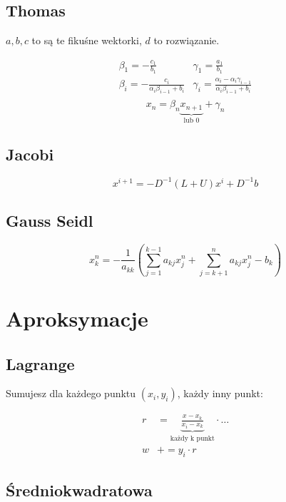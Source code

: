 \documentclass[a5paper,10pt]{article}
\begin{document}
\begin{multicols}{2}
    \subsection{Thomas}

    $a, b, c$ to są te fikuśne wektorki, $d$ to rozwiązanie.

    \[
        \begin{matrix}
            \beta_1 = - \frac{c_1}{b_1}     & \gamma_1 = \frac{a_1}{b_1} \\
            \beta_i = - \frac{c_i}{\alpha_i \beta_{i-1} + b_i} & \gamma_i =
            \frac{\alpha_i - \alpha_i \gamma_{i - 1}}{\alpha_i \beta_{i - 1} +
            b_i}\\
        \end{matrix}
    \]
    \[
        x_n = \beta_n \underbrace{x_{n+1}}_{\text{lub 0}} + \gamma_n
    \]

    \subsection{Jacobi}

    \[x^{i+1} = -D^{-1} \left(L + U\right) x^i + D^{-1} b \]


    \subsection{Gauss Seidl}

    \[
        x_k^n = - \frac{1}{a_{kk}} \left(
            \sum^{k-1}_{j=1} a_{kj} x^n_j + \sum^n_{j = k + 1} a_{kj} x_j^n -
            b_k
        \right)
    \]

    \section{Aproksymacje}

    \subsection{Lagrange}

    Sumujesz dla każdego punktu $\left(x_i, y_i\right)$, każdy inny punkt:

    \begin{align*}
        r &= \underbrace{\frac{x - x_k}{x_i - x_k}}_{\text{każdy k punkt}} \cdot
        \dots \\
        w &+= y_i \cdot r
    \end{align*}

    \subsection{Średniokwadratowa}


\end{multicols}
\end{document}
